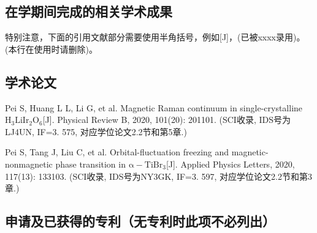 \begin{resume}


  \section*{在学期间完成的相关学术成果}

  特别注意，下面的引用文献部分需要使用半角括号，例如[J]，(已被xxxx录用)。(本行在使用时请删除)。

  \subsection*{学术论文}

  \begin{achievements}
    \item Pei S, Huang L L, Li G, et al. Magnetic Raman continuum in single-crystalline $\mathrm{H_3LiIr_2O_6}$[J]. Physical Review B, 2020, 101(20): 201101. (SCI收录, IDS号为LJ4UN, IF=3. 575, 对应学位论文2.2节和第5章.)
    \item Pei S, Tang J, Liu C, et al. Orbital-fluctuation freezing and magnetic-nonmagnetic phase transition in $\mathrm{α-TiBr_3}$[J]. Applied Physics Letters, 2020, 117(13): 133103. (SCI收录, IDS号为NY3GK, IF=3. 597, 对应学位论文2.2节和第3章.)
  \end{achievements}

  \subsection*{申请及已获得的专利（无专利时此项不必列出）}


\end{resume}
